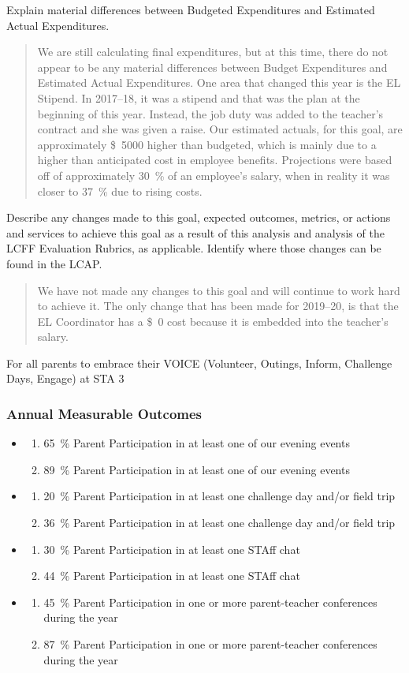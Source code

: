 \documentclass{article}
\makeatletter
\newcommand{\dollar}[1]{\SI{#1}[\$]{}}
\newcounter{goal}[section] %
\newcommand*{\expact}[1]{%
	\expandafter\@expact\csname c@#1\endcsname%
}
\newcommand*{\@expact}[1]{%
	$\ifcase\intcalcAdd{1}{\intcalcMod{\intcalcSub{#1}{1}}{2}}
		\or{\text{Expected:}}
		\or{\text{Actual:}}
    \else\@ctrerr\fi$
}
\newcommand{\outcome}[2]{
	\item
	\begin{enumerate}[label=\expact*]
	\setlength{\itemsep}{0pt}
	\item #1
	\item #2
	\end{enumerate}
}
\newenvironment{outcomes}
	{
		\subsubsection{Annual Measurable Outcomes}
		\begin{itemize}[label={}]
	}
	{\end{itemize}}
\newcounter{action}[goal]
\makeatother
\begin{document}
Explain material differences between Budgeted Expenditures and Estimated Actual Expenditures.
\begin{quotation}
	We are still calculating final expenditures, but at this time, there do not appear to be any material differences between Budget Expenditures and Estimated Actual Expenditures. One area that changed this year is the EL Stipend. In 2017--18, it was a stipend and that was the plan at the beginning of this year. Instead, the job duty was added to the teacher's contract and she was given a raise. Our estimated actuals, for this goal, are approximately \dollar{5000} higher than budgeted, which is mainly due to a higher than anticipated cost in employee benefits. Projections were based off of approximately \SI{30}{\percent} of an employee's salary, when in reality it was closer to \SI{37}{\percent} due to rising costs.
\end{quotation}

Describe any changes made to this goal, expected outcomes, metrics, or actions and services to achieve this goal as a result of this analysis and analysis of the LCFF Evaluation Rubrics, as applicable. Identify where those changes can be found in the LCAP.
\begin{quotation}
	We have not made any changes to this goal and will continue to work hard to achieve it. The only change that has been made for 2019--20, is that the EL Coordinator has a \dollar{0} cost because it is embedded into the teacher's salary.
\end{quotation}

\Goal
	{For all parents to embrace their VOICE (Volunteer, Outings, Inform, Challenge Days, Engage) at STA}
	{3}
	{}

\begin{outcomes}
	\outcome
	{\SI{65}{\percent} Parent Participation in at least one of our evening events}
	{\SI{89}{\percent} Parent Participation in at least one of our evening events}
	\outcome
	{\SI{20}{\percent} Parent Participation in at least one challenge day and/or field trip}
	{\SI{36}{\percent} Parent Participation in at least one challenge day and/or field trip}
	\outcome
	{\SI{30}{\percent} Parent Participation in at least one STAff chat}
	{\SI{44}{\percent} Parent Participation in at least one STAff chat}
	\outcome
	{\SI{45}{\percent} Parent Participation in one or more parent-teacher conferences during the year}
	{\SI{87}{\percent} Parent Participation in one or more parent-teacher conferences during the year}
\end{outcomes}
\end{document}

